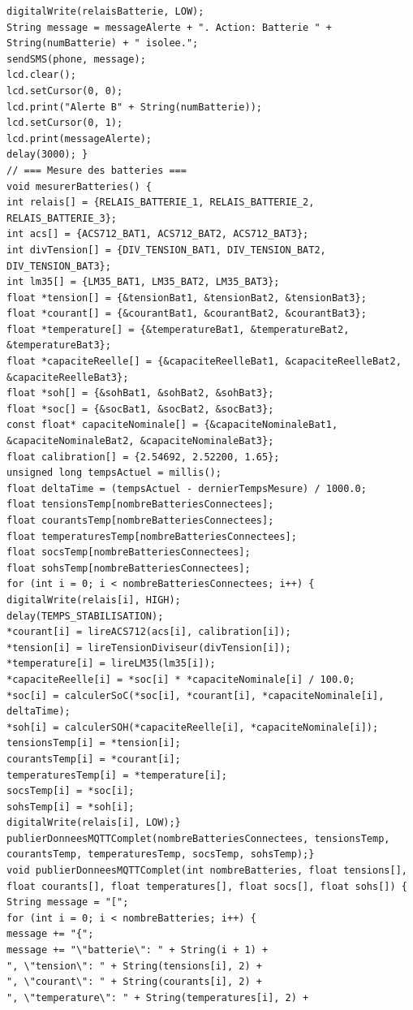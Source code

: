 \begin{lstlisting}[caption=Code de monitoring des batteries]
digitalWrite(relaisBatterie, LOW);
String message = messageAlerte + ". Action: Batterie " + String(numBatterie) + " isolee.";
sendSMS(phone, message);
lcd.clear();
lcd.setCursor(0, 0);
lcd.print("Alerte B" + String(numBatterie));
lcd.setCursor(0, 1);
lcd.print(messageAlerte);
delay(3000); }
// === Mesure des batteries ===
void mesurerBatteries() {
int relais[] = {RELAIS_BATTERIE_1, RELAIS_BATTERIE_2, RELAIS_BATTERIE_3};
int acs[] = {ACS712_BAT1, ACS712_BAT2, ACS712_BAT3};
int divTension[] = {DIV_TENSION_BAT1, DIV_TENSION_BAT2, DIV_TENSION_BAT3};
int lm35[] = {LM35_BAT1, LM35_BAT2, LM35_BAT3};
float *tension[] = {&tensionBat1, &tensionBat2, &tensionBat3};
float *courant[] = {&courantBat1, &courantBat2, &courantBat3};
float *temperature[] = {&temperatureBat1, &temperatureBat2, &temperatureBat3};
float *capaciteReelle[] = {&capaciteReelleBat1, &capaciteReelleBat2, &capaciteReelleBat3};
float *soh[] = {&sohBat1, &sohBat2, &sohBat3};
float *soc[] = {&socBat1, &socBat2, &socBat3};
const float* capaciteNominale[] = {&capaciteNominaleBat1, &capaciteNominaleBat2, &capaciteNominaleBat3};
float calibration[] = {2.54692, 2.52200, 1.65};
unsigned long tempsActuel = millis();
float deltaTime = (tempsActuel - dernierTempsMesure) / 1000.0; 
float tensionsTemp[nombreBatteriesConnectees];
float courantsTemp[nombreBatteriesConnectees];
float temperaturesTemp[nombreBatteriesConnectees];
float socsTemp[nombreBatteriesConnectees];
float sohsTemp[nombreBatteriesConnectees];
for (int i = 0; i < nombreBatteriesConnectees; i++) {
digitalWrite(relais[i], HIGH);
delay(TEMPS_STABILISATION);
*courant[i] = lireACS712(acs[i], calibration[i]);
*tension[i] = lireTensionDiviseur(divTension[i]);
*temperature[i] = lireLM35(lm35[i]);
*capaciteReelle[i] = *soc[i] * *capaciteNominale[i] / 100.0;
*soc[i] = calculerSoC(*soc[i], *courant[i], *capaciteNominale[i], deltaTime);
*soh[i] = calculerSOH(*capaciteReelle[i], *capaciteNominale[i]);
tensionsTemp[i] = *tension[i];
courantsTemp[i] = *courant[i];
temperaturesTemp[i] = *temperature[i];
socsTemp[i] = *soc[i];
sohsTemp[i] = *soh[i];
digitalWrite(relais[i], LOW);}
publierDonneesMQTTComplet(nombreBatteriesConnectees, tensionsTemp, courantsTemp, temperaturesTemp, socsTemp, sohsTemp);}
void publierDonneesMQTTComplet(int nombreBatteries, float tensions[], float courants[], float temperatures[], float socs[], float sohs[]) {
String message = "[";
for (int i = 0; i < nombreBatteries; i++) {
message += "{";
message += "\"batterie\": " + String(i + 1) +
", \"tension\": " + String(tensions[i], 2) +
", \"courant\": " + String(courants[i], 2) +
", \"temperature\": " + String(temperatures[i], 2) +

\end{lstlisting}
